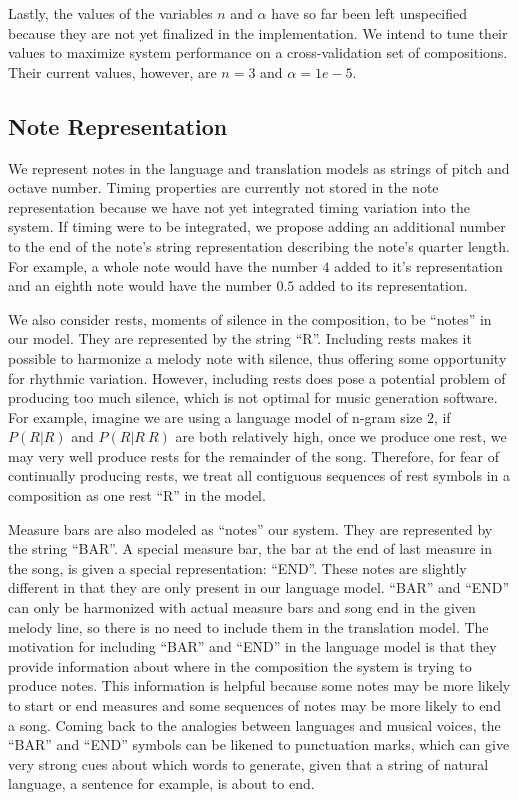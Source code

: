 \documentclass{sig-alternate}
\begin{document}
Lastly, the values of the variables $n$ and $\alpha$ have so far been left unspecified because they are not yet finalized in the implementation. We intend to tune their values to maximize system performance on a cross-validation set of compositions. Their current values, however, are $n = 3$ and $\alpha = 1e-5$.

\subsection{Note Representation}
We represent notes in the language and translation models as strings of pitch and octave number. Timing properties are currently not stored in the note representation because we have not yet integrated timing variation into the system. If timing were to be integrated, we propose adding an additional number to the end of the note's string representation describing the note's quarter length. For example, a whole note would have the number $4$ added to it's representation and an eighth note would have the number $0.5$ added to its representation. 

We also consider rests, moments of silence in the composition, to be ``notes'' in our model. They are represented by the string ``R''. Including rests makes it possible to harmonize a melody note with silence, thus offering some opportunity for rhythmic variation. However, including rests does pose a potential problem of producing too much silence, which is not optimal for music generation software. For example, imagine we are using a language model of n-gram size $2$, if $P(R | R)$ and $P (R | R\ R)$ are both relatively high, once we produce one rest, we may very well produce rests for the remainder of the song. Therefore, for fear of continually producing rests, we treat all contiguous sequences of rest symbols in a composition as one rest ``R'' in the model.

Measure bars are also modeled as ``notes'' our system. They are represented by the string ``BAR''. A special measure bar, the bar at the end of last measure in the song, is given a special representation: ``END''. These notes are slightly different in that they are only present in our language model. ``BAR'' and ``END'' can only be harmonized with actual measure bars and song end in the given melody line, so there is no need to include them in the translation model. The motivation for including ``BAR'' and ``END'' in the language model is that they provide information about where in the composition the system is trying to produce notes. This information is helpful because some notes may be more likely to start or end measures and some sequences of notes may be more likely to end a song. Coming back to the analogies between languages and musical voices, the ``BAR'' and ``END'' symbols can be likened to punctuation marks, which can give very strong cues about which words to generate, given that a string of natural language, a sentence for example, is about to end.
\end{document}
